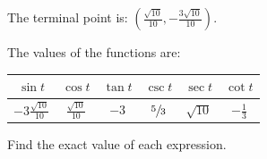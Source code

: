 \documentclass[fleqn,addpoints]{exam}
\begin{document}
\begin{questions}
\begin{solution}
        The terminal point is: $\left( \frac{\sqrt{10}}{10}, -\frac{3 \sqrt{10}}{10} \right)$.

        The values of the functions are:

        \begin{center}
          \begin{tabular}[H]{cccccc}
            \toprule
            $\sin t$                  & $\cos t$               & $\tan t$ & $\csc t$       & $\sec t$    & $\cot t$ \\
            \midrule
            $-3 \frac{\sqrt{10}}{10}$ & $\frac{\sqrt{10}}{10}$ & $-3$     & $\sfrac{5}{3}$ & $\sqrt{10}$ & $- \frac{1}{3}$ \\
            \bottomrule
          \end{tabular}
        \end{center}

      \end{solution}

      \question Find the exact value of each expression.
\end{questions}
\end{document}
